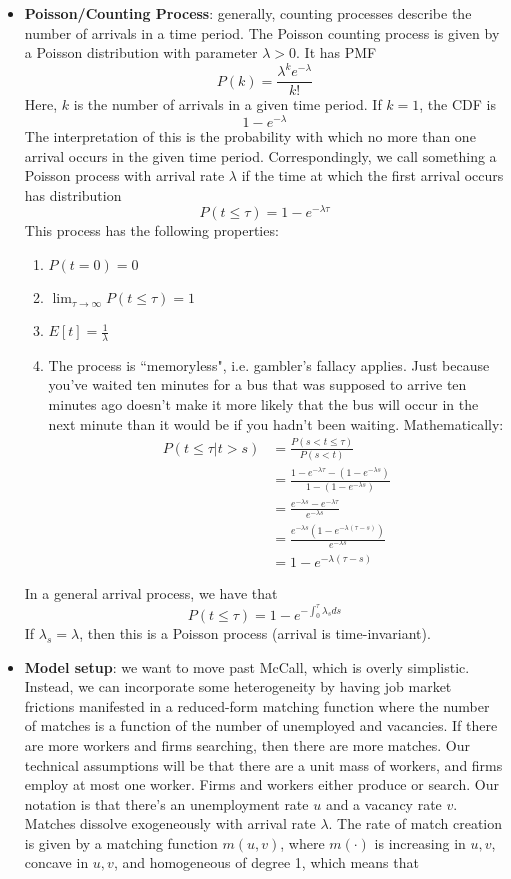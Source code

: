 \documentclass[12pt]{article}
\begin{document}
\begin{itemize}
    \item \textbf{Poisson/Counting Process}: generally, counting processes describe the number of arrivals in a time period. The Poisson counting process is given by a Poisson distribution with parameter $\lambda > 0$. It has PMF
    \[P(k) = \frac{\lambda^k e^{-\lambda}}{k!}\]
    Here, $k$ is the number of arrivals in a given time period. If $k=1$, the CDF is
    \[1-e^{-\lambda}\]
    The interpretation of this is the probability with which no more than one arrival occurs in the given time period. Correspondingly, we call something a Poisson process with arrival rate $\lambda$ if the time at which the first arrival occurs has distribution 
    \[P(t\leq \tau) = 1 - e^{-\lambda \tau}\]
    This process has the following properties:
    \begin{enumerate}
        \item $P(t = 0) = 0$ \\
        \item $\lim_{\tau \to \infty} P(t \leq \tau) = 1$
        \item $E[t] = \frac{1}{\lambda}$
        \item The process is ``memoryless", i.e. gambler's fallacy applies. Just because you've waited ten minutes for a bus that was supposed to arrive ten minutes ago doesn't make it more likely that the bus will occur in the next minute than it would be if you hadn't been waiting. Mathematically:
        \[\begin{split}
            P(t \leq \tau | t > s) &= \frac{P(s < t \leq \tau)}{P(s < t)} \\
            &= \frac{1-e^{-\lambda \tau} - (1-e^{-\lambda s})}{1 - (1-e^{-\lambda s})} \\
            &= \frac{e^{-\lambda s} - e^{-\lambda \tau}}{e^{-\lambda s}} \\
            &= \frac{e^{-\lambda s}(1 - e^{-\lambda (\tau - s)})}{e^{-\lambda s}} \\
            &= 1- e^{-\lambda(\tau - s)}
        \end{split}\]
    \end{enumerate}
    In a general arrival process, we have that
    \[P(t \leq \tau) = 1 - e^{-\int_0^{\tau}\lambda_sds}\]
    If $\lambda_s = \lambda$, then this is a Poisson process (arrival is time-invariant).
    \item \textbf{Model setup}: we want to move past McCall, which is overly simplistic. Instead, we can incorporate some heterogeneity by having job market frictions manifested in a reduced-form matching function where the number of matches is a function of the number of unemployed and vacancies. If there are more workers and firms searching, then there are more matches. Our technical assumptions will be that there are a unit mass of workers, and firms employ at most one worker. Firms and workers either produce or search. Our notation is that there's an unemployment rate $u$ and a vacancy rate $v$. Matches dissolve exogeneously with arrival rate $\lambda$. The rate of match creation is given by a matching function $m(u,v)$, where $m(\cdot)$ is increasing in $u,v$, concave in $u,v$, and homogeneous of degree 1, which means that

\end{itemize}
\end{document}
